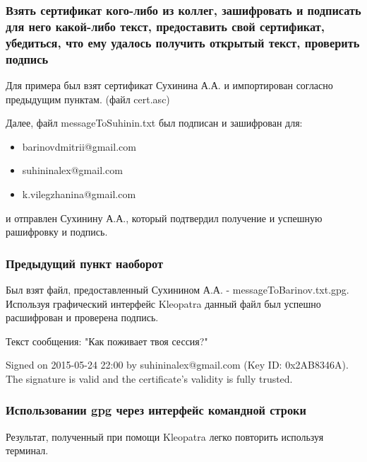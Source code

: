 \documentclass[a4paper, 12pt]{article}
\begin{document}
\subsubsection{Взять сертификат кого-либо из коллег, зашифровать и подписать для него какой-либо текст, предоставить свой сертификат, убедиться, что ему удалось получить открытый текст, проверить подпись}

Для примера был взят сертификат Сухинина А.А. и импортирован согласно предыдущим пунктам. (файл cert.asc)

Далее, файл messageToSuhinin.txt был подписан и зашифрован для: 
\begin{itemize}
\item{barinovdmitrii@gmail.com} 
\item{suhininalex@gmail.com}
\item{k.vilegzhanina@gmail.com}
\end{itemize}

и отправлен Сухинину А.А., который подтвердил получение и успешную рашифровку и подпись.

\subsubsection{Предыдущий пункт наоборот}

Был взят файл, предоставленный Сухинином А.А. - messageToBarinov.txt.gpg.  Используя графический интерфейс Kleopatra данный файл был успешно расшифрован и проверена подпись. 

Текст сообщения: "Как поживает твоя сессия?" 

Signed on 2015-05-24 22:00 by suhininalex@gmail.com (Key ID: 0x2AB8346A).
The signature is valid and the certificate's validity is fully trusted.


\subsubsection{Использовании gpg через интерфейс командной строки}

Результат, полученный при помощи Kleopatra легко повторить используя терминал. 
\end{document}

